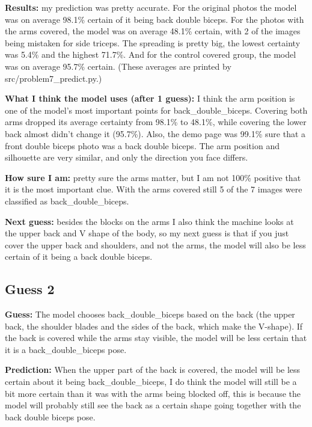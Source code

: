 \documentclass[11pt]{article}
\begin{document}

\textbf{Results:} my prediction was pretty accurate. For the original photos the model was on average 98.1\% certain of it being back double biceps. For the photos with the arms covered, the model was on average 48.1\% certain, with 2 of the images being mistaken for side triceps. The spreading is pretty big, the lowest certainty was 5.4\% and the highest 71.7\%. And for the control covered group, the model was on average 95.7\% certain. (These averages are printed by src/problem7\_predict.py.)

\textbf{What I think the model uses (after 1 guess):} I think the arm position is one of the model's most important points for back\_double\_biceps. Covering both arms dropped its average certainty from 98.1\% to 48.1\%, while covering the lower back almost didn't change it (95.7\%). Also, the demo page was 99.1\% sure that a front double biceps photo was a back double biceps. The arm position and silhouette are very similar, and only the direction you face differs.

\textbf{How sure I am:} pretty sure the arms matter, but I am not 100\% positive that it is the most important clue. With the arms covered still 5 of the 7 images were classified as back\_double\_biceps.

\textbf{Next guess:} besides the blocks on the arms I also think the machine looks at the upper back and V shape of the body, so my next guess is that if you just cover the upper back and shoulders, and not the arms, the model will also be less certain of it being a back double biceps.

\subsection*{Guess 2}

\textbf{Guess:} The model chooses back\_double\_biceps based on the back (the upper back, the shoulder blades and the sides of the back, which make the V-shape). If the back is covered while the arms stay visible, the model will be less certain that it is a back\_double\_biceps pose.

\textbf{Prediction:} When the upper part of the back is covered, the model will be less certain about it being back\_double\_biceps, I do think the model will still be a bit more certain than it was with the arms being blocked off, this is because the model will probably still see the back as a certain shape going together with the back double biceps pose.
\end{document}
